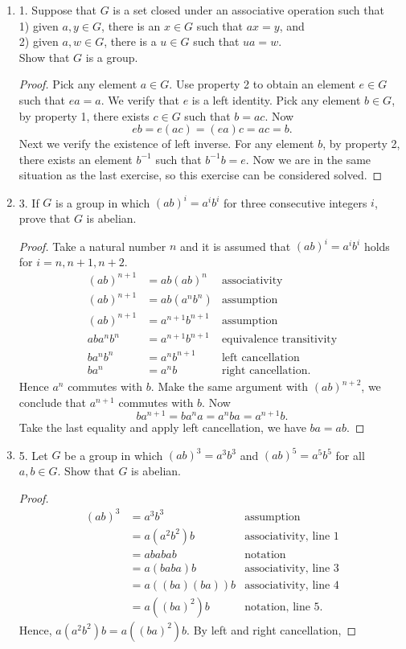 \begin{enumerate}[resume]
\item 1. Suppose that $G$ is a set closed under an associative operation such that\\
1) given $a, y \in G$, there is an $x \in G$ such that $a x=y$, and\\
2) given $a, w \in G$, there is a $u \in G$ such that $u a=w$.\\
Show that $G$ is a group. 
\begin{proof}
Pick any element $a \in G$. Use property 2 to obtain an element $e \in G$ such that $ea = a$. We verify that $e$ is a left identity. Pick any element $b \in G$, by property 1, there exists $c \in G$ such that $b = ac$. Now
\[
eb = e (ac) = (ea) c = ac = b
.\] 
Next we verify the existence of left inverse. For any element $b$, by property 2, there exists an element  $b^{-1}$ such that $b^{-1} b = e$. Now we are in the same situation as the last exercise, so this exercise can be considered solved.
\end{proof}

\item 3. If $G$ is a group in which $(a b)^i=a^i b^i$ for three consecutive integers $i$, prove that $G$ is abelian.
\begin{proof}
	Take a natural number $n$ and it is assumed that $(ab)^i = a^i b^i$ holds for $i = n, n+1, n+2$.
	\begin{align*}
	(ab)^{n+1} &= ab(ab)^n &\text{associativity} \\
	(ab)^{n+1} &= ab(a^n b^n) & \text{assumption} \\
	(ab)^{n+1} &= a^{n+1} b^{n+1} &\text{assumption}\\
	ab a^n b^n &= a^{n+1} b^{n+1} &\text{equivalence transitivity}\\
	b a^n b^n &= a^{n} b^{n+1} &\text{left cancellation}\\
	b a^n &= a^{n} b &\text{right cancellation}
	.\end{align*}
Hence $a^n$ commutes with $b$. Make the same argument with $(ab)^{n+2}$, we conclude that $a^{n+1}$ commutes with $b$. Now
\[
b a ^{n+1} = b a^n a = a^n b a = a^{n+1} b
.\] 
Take the last equality and apply left cancellation, we have $ba = ab $.
\end{proof}

\item 5. Let $G$ be a group in which $(a b)^3=a^3 b^3$ and $(a b)^5=a^5 b^5$ for all $a, b \in G$. Show that $G$ is abelian.
\begin{proof}
	\begin{align*}
		(ab)^{3} &= a^3 b^3 &\text{assumption}\\
			 &= a(a^2b^2)b &\text{associativity, line 1} \\
			 &= ababab &\text{notation} \\
			 &= a(baba)b &\text{associativity, line 3}\\
			 &= a((ba)(ba))b &\text{associativity, line 4}\\
			 &= a((ba)^2)b &\text{notation, line 5}
	.\end{align*}
Hence, $a(a^2b^2)b = a((ba)^2)b $. By left and right cancellation,


\end{proof}
\end{enumerate}
